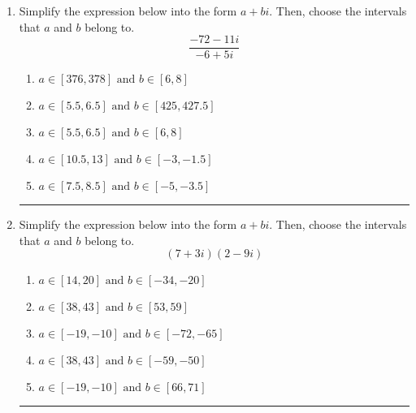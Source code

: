\documentclass[14pt]{extbook}
\newcommand{\litem}[1]{\item#1\hspace*{-1cm}\rule{\textwidth}{0.4pt}}
\begin{document}
\begin{enumerate}
{\begin{enumerate}[label=\Alph*.]
\end{enumerate} }
\litem{
Simplify the expression below into the form $a+bi$. Then, choose the intervals that $a$ and $b$ belong to.\[ \frac{-72 - 11 i}{-6 + 5 i} \]\begin{enumerate}[label=\Alph*.]
\item \( a \in [376, 378] \text{ and } b \in [6, 8] \)
\item \( a \in [5.5, 6.5] \text{ and } b \in [425, 427.5] \)
\item \( a \in [5.5, 6.5] \text{ and } b \in [6, 8] \)
\item \( a \in [10.5, 13] \text{ and } b \in [-3, -1.5] \)
\item \( a \in [7.5, 8.5] \text{ and } b \in [-5, -3.5] \)

\end{enumerate} }
\litem{
Simplify the expression below into the form $a+bi$. Then, choose the intervals that $a$ and $b$ belong to.\[ (7 + 3 i)(2 - 9 i) \]\begin{enumerate}[label=\Alph*.]
\item \( a \in [14, 20] \text{ and } b \in [-34, -20] \)
\item \( a \in [38, 43] \text{ and } b \in [53, 59] \)
\item \( a \in [-19, -10] \text{ and } b \in [-72, -65] \)
\item \( a \in [38, 43] \text{ and } b \in [-59, -50] \)
\item \( a \in [-19, -10] \text{ and } b \in [66, 71] \)

\end{enumerate} }
\end{enumerate}
\end{document}
